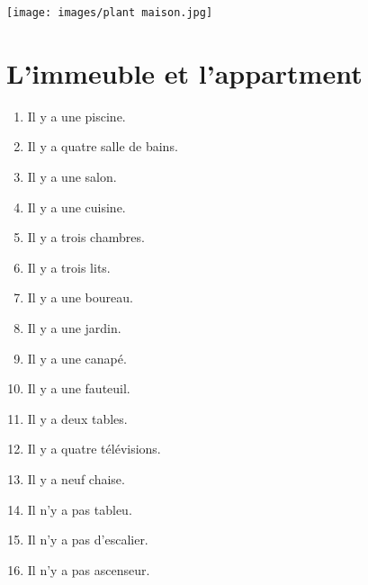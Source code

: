 
\texttt{[image: images/plant maison.jpg]}

\newpage

\section{L'immeuble et l'appartment}
\begin{enumerate}
    \item Il y a une piscine.
    \item Il y a quatre salle de bains.
    \item Il y a une salon.
    \item Il y a une cuisine.
    \item Il y a trois chambres.
    \item Il y a trois lits.
    \item Il y a une boureau.
    \item Il y a une jardin.
    \item Il y a une canapé.
    \item Il y a une fauteuil.
    \item Il y a deux tables.
    \item Il y a quatre télévisions.
    \item Il y a neuf chaise.
    \item Il n'y a pas tableu.
    \item Il n'y a pas d'escalier.
    \item Il n'y a pas ascenseur.
\end{enumerate}